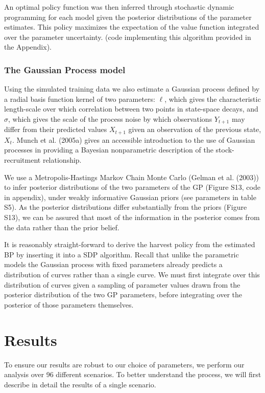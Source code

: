 \documentclass[author-year, 12pt,review]{elsarticle} %
\begin{document}
An optimal policy function was then inferred through stochastic dynamic
programming for each model given the posterior distributions of the
parameter estimates. This policy maximizes the expectation of the value
function integrated over the parameter uncertainty. (code implementing
this algorithm provided in the Appendix).

\subsubsection{The Gaussian Process
model}\label{the-gaussian-process-model}

Using the simulated training data we also estimate a Gaussian process
defined by a radial basis function kernel of two parameters: $\ell$,
which gives the characteristic length-scale over which correlation
between two points in state-space decays, and $\sigma$, which gives the
scale of the process noise by which observations $Y_{t+1}$ may differ
from their predicted values $X_{t+1}$ given an observation of the
previous state, $X_t$. Munch et al. (2005a) gives an accessible
introduction to the use of Gaussian processes in providing a Bayesian
nonparametric description of the stock-recruitment relationship.

We use a Metropolis-Hastings Markov Chain Monte Carlo (Gelman et al.
(2003)) to infer posterior distributions of the two parameters of the GP
(Figure S13, code in appendix), under weakly informative Gaussian priors
(see parameters in table S5). As the posterior distributions differ
substantially from the priors (Figure S13), we can be assured that most
of the information in the posterior comes from the data rather than the
prior belief.

It is reasonably straight-forward to derive the harvest policy from the
estimated BP by inserting it into a SDP algorithm. Recall that unlike
the parametric models the Gaussian process with fixed parameters already
predicts a distribution of curves rather than a single curve. We must
first integrate over this distribution of curves given a sampling of
parameter values drawn from the posterior distribution of the two GP
parameters, before integrating over the posterior of those parameters
themselves.

\section{Results}\label{results}

To ensure our results are robust to our choice of parameters, we perform
our analysis over 96 different scenarios. To better understand the
process, we will first describe in detail the results of a single
scenario.
\end{document}
